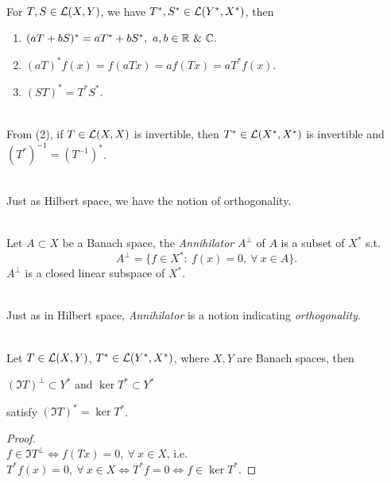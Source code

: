 \vspace{3pt}
\begin{proposition}\ \\
For $T,S \in \mathcal{L}(X,Y)$, we have $T^*,S^* \in \mathcal{L}(Y^*, X^*)$, then
\begin{enumerate}[label = (\arabic*)]
    \item $(aT + bS)^* = aT^* + b S^*,\ a,b \in \mathbb{R}\ \&\ \mathbb{C}.$
    \item $(a T)^* f(x) = f(a Tx) = af(Tx) = aT^* f(x)$.
    \item $(ST)^* = T^* S^*$.
\end{enumerate}
\end{proposition}
\begin{remark}\ \\
From (2), if $T \in \mathcal{L}(X,X)$ is invertible, then $T^* \in \mathcal{L}(X^*,X^*)$ is invertible and $(T^*)^{-1} = (T^{-1})^*$.
\end{remark}

\begin{remark}\ \\
Just as Hilbert space, we have the notion of orthogonality.
\end{remark}

\vspace{3pt}
\begin{definition}[Annihilator]\ \\
Let $A \subset X$ be a Banach space, the \textit{Annihilator} $A^\perp$ of $A$ is a subset of $X^*$ s.t.
\begin{equation*}
    A^\perp = \{f \in X^*:\ f(x) = 0,\ \forall\ x \in A\}.
\end{equation*}
$A^\perp$ is a closed linear subspace of $X^*$.
\end{definition}
\begin{remark}\ \\
Just as in Hilbert space, \textit{Annihilator} is a notion indicating \textit{orthogonality}. 
\end{remark}

\vspace{3pt}
\begin{proposition}\label{5.7}\ \\
Let $T \in \mathcal{L}(X,Y)$, $T^* \in \mathcal{L}(Y^*, X^*)$, where $X,Y$ are Banach spaces, then
\begin{center}
    $(\Im{T})^\perp \subset Y^*$ and $\ker{T^*} \subset Y^*$
\end{center}
satisfy $(\Im{T})^* = \ker{T^*}$.
\end{proposition}
\begin{proof}\ \\
$f \in \Im{T}^\perp \Leftrightarrow f(Tx) = 0,\ \forall\ x \in X$, i.e.  $T^*f(x) = 0,\ \forall\ x \in X \Leftrightarrow T^*f = 0 \Leftrightarrow f \in \ker{T^*}$.
\end{proof}

